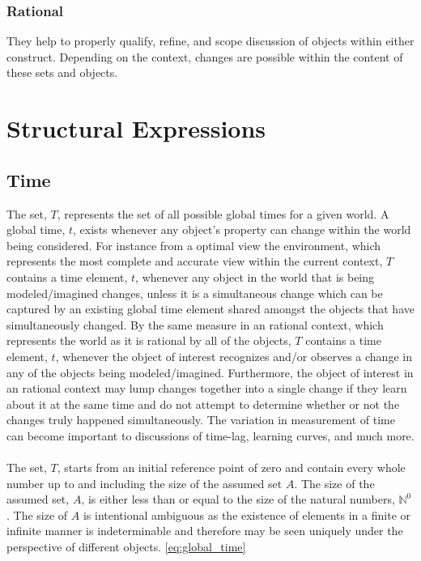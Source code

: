 \documentclass[]{article}
\begin{document}
\subsubsection*{Rational}
They help to properly qualify, refine, and scope discussion of objects within either construct. Depending on the context, changes are possible within the content of these sets and objects.


\section*{Structural Expressions}
\subsection*{Time}
The set, $T$, represents the set of all possible global times for a given world. A global time, $t$, exists whenever any object's property can change within the world being considered. For instance from a optimal view the environment, which represents the most complete and accurate view within the current context, $T$ contains a time element, $t$, whenever any object in the world that is being modeled/imagined changes, unless it is a simultaneous change which can be captured by an existing global time element shared amongst the objects that have simultaneously changed. By the same measure in an rational context, which represents the world as it is rational by all of the objects, $T$ contains a time element, $t$, whenever the object of interest recognizes and/or observes a change in any of the objects being modeled/imagined. Furthermore, the object of interest in an rational context may lump changes together into a single change if they learn about it at the same time and do not attempt to determine whether or not the changes truly happened simultaneously. The variation in measurement of time can become important to discussions of time-lag, learning curves, and much more. 
\\
\\
The set, $T$, starts from an initial reference point of zero and contain every whole number up to and including the size of the assumed set $A$. The size of the assumed set, $A$, is either less than or equal to the size of the natural numbers, $\mathbb{N}^{0}$. The size of $A$ is intentional ambiguous as the existence of elements in a finite or infinite manner is indeterminable and therefore may be seen uniquely under the perspective of different objects. \eqref{eq:global_time}
\end{document}
